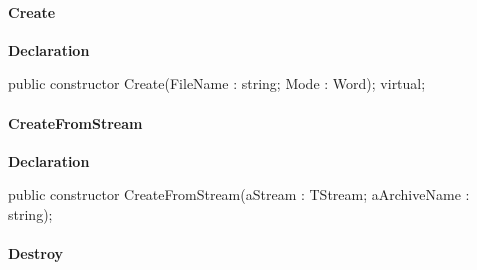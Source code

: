 \documentclass{report}
\newif\ifpdf
\begin{document}
\paragraph*{Create}\hspace*{\fill}

\label{AbArcTyp.TAbArchive-Create}
\begin{list}{}{
\setlength{\itemindent}{0cm}
\setlength{\listparindent}{0cm}
\setlength{\leftmargin}{\evensidemargin}
\addtolength{\leftmargin}{\tmplength}
\settowidth{\labelsep}{X}
\addtolength{\leftmargin}{\labelsep}
\setlength{\labelwidth}{\tmplength}
}
\item[\textbf{Declaration}\hfill]
\ifpdf
\begin{flushleft}
\fi
\begin{ttfamily}
public constructor Create(FileName : string; Mode : Word); virtual;\end{ttfamily}

\ifpdf
\end{flushleft}
\fi

\end{list}
\paragraph*{CreateFromStream}\hspace*{\fill}

\label{AbArcTyp.TAbArchive-CreateFromStream}
\begin{list}{}{
\setlength{\itemindent}{0cm}
\setlength{\listparindent}{0cm}
\setlength{\leftmargin}{\evensidemargin}
\addtolength{\leftmargin}{\tmplength}
\settowidth{\labelsep}{X}
\addtolength{\leftmargin}{\labelsep}
\setlength{\labelwidth}{\tmplength}
}
\item[\textbf{Declaration}\hfill]
\ifpdf
\begin{flushleft}
\fi
\begin{ttfamily}
public constructor CreateFromStream(aStream : TStream; aArchiveName : string);\end{ttfamily}

\ifpdf
\end{flushleft}
\fi

\end{list}
\paragraph*{Destroy}\hspace*{\fill}
\end{document}
